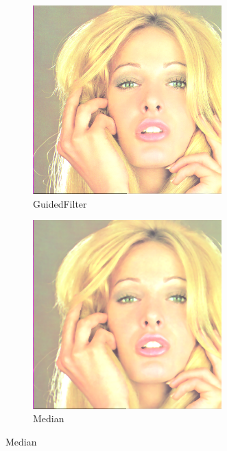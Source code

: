 \documentclass[12pt]{article}
\begin{document}
\begin{figure}
		\begin{subfigure}{0.4\textwidth}
			\centering
			\includegraphics[width=0.8\textwidth]{tiffany/tiffanytiffGuidedFilter.png}
			\caption{GuidedFilter}
		\end{subfigure}
		\begin{subfigure}{0.4\textwidth}
			\centering
			\includegraphics[width=0.8\textwidth]{tiffany/tiffanytiffMedianFilter.png}
			\caption{Median}
		\end{subfigure}
		

\end{figure}
\end{document}
